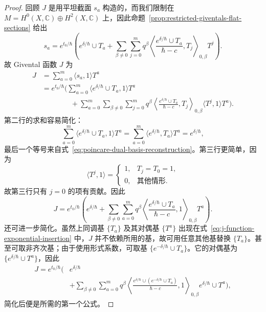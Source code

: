 \begin{proof}
回顾 $J$ 是用平坦截面 $s_a$ 构造的，而我们限制在 $M=H^0(X,\mathbb C)\oplus H^2(X,\mathbb C)$ 上，因此命题~\ref{prop:restricted-giventals-flat-sections} 给出
\[
s_a=e^{t_0/\hbar}\left(e^{\delta/\hbar}\cup T_a
+\sum_{\beta\ne0}\sum_{j=0}^m q^\beta
\left\langle\frac{e^{\delta/\hbar}\cup T_a}{\hbar-c},T_j\right\rangle_{0,\beta}T^j\right).
\]
故 Givental 函数 $J$ 为
\begin{equation}\label{eq:j-function-flat-section-expansion}
\begin{aligned}
J&=\sum_{a=0}^m\langle s_a,1\rangle T^a\\
&=e^{t_0/\hbar}\biggl(\sum_{a=0}^m\langle e^{\delta/\hbar}\cup T_a,1\rangle T^a\\
&\hspace{4em}+\sum_{a=0}^m\sum_{\beta\ne0}\sum_{j=0}^m q^\beta
\left\langle\frac{e^{\delta/\hbar}\cup T_a}{\hbar-c},T_j\right\rangle_{0,\beta}
\langle T^j,1\rangle T^a\biggr).
\end{aligned}
\end{equation}
第二行的求和容易简化：
\[
\sum_{a=0}^m\langle e^{\delta/\hbar}\cup T_a,1\rangle T^a
=\sum_{a=0}^m\langle e^{\delta/\hbar},T_a\rangle T^a=e^{\delta/\hbar},
\]
最后一个等号来自式~\eqref{eq:poincare-dual-basis-reconstruction}。第三行更简单，因为
\[
\langle T^j,1\rangle=
\begin{cases}1,&T_j=T_0=1,\\0,&\text{其他情形}.
\end{cases}
\]
故第三行只有 $j=0$ 的项有贡献。因此
\begin{equation}\label{eq:j-function-exponential-insertion}
J=e^{t_0/\hbar}\left(e^{\delta/\hbar}
+\sum_{\beta\ne0}\sum_{a=0}^m q^\beta
\left\langle\frac{e^{\delta/\hbar}\cup T_a}{\hbar-c},1\right\rangle_{0,\beta}T^a\right).
\end{equation}
还可进一步简化。虽然上同调基 $\{T_a\}$ 及其对偶基 $\{T^a\}$ 出现在式~\eqref{eq:j-function-exponential-insertion} 中，$J$ 并不依赖所用的基，故可用任意其他基替换 $\{T_a\}$。甚至可取非齐次基；由于使用形式系数，可取基 $\{e^{-\delta/\hbar}\cup T_a\}$。它的对偶基为 $\{e^{\delta/\hbar}\cup T^a\}$，因此
\[
\begin{aligned}
J=e^{t_0/\hbar}\biggl(&e^{\delta/\hbar}\\
&+\sum_{\beta\ne0}\sum_{a=0}^m q^\beta
\left\langle\frac{e^{\delta/\hbar}\cup(e^{-\delta/\hbar}\cup T_a)}{\hbar-c},1\right\rangle_{0,\beta}
e^{\delta/\hbar}\cup T^a\biggr),
\end{aligned}
\]
简化后便是所需的第一个公式。


\end{proof}
